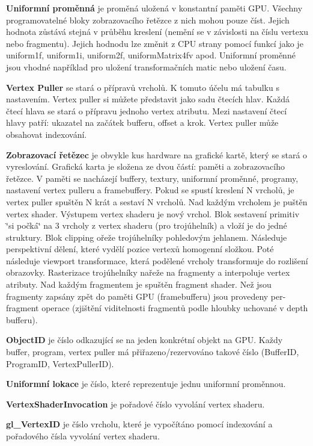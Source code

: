 {\bfseries Uniformní proměnná} je proměná uložená v konstantní paměti G\+PU. Všechny programovatelné bloky zobrazovacího řetězce z nich mohou pouze číst. Jejich hodnota zůstává stejná v průběhu kreslení (nemění se v závislosti na číslu vertexu nebo fragmentu). Jejich hodnodu lze změnit z C\+PU strany pomocí funkcí jako je uniform1f, uniform1i, uniform2f, uniform\+Matrix4fv apod. Uniformní proměnné jsou vhodné například pro uložení transformačních matic nebo uložení času.

{\bfseries Vertex Puller} se stará o přípravů vrcholů. K tomuto účelu má tabulku s nastavením. Vertex puller si můžete představit jako sadu čtecích hlav. Každá čtecí hlava se stará o přípravu jednoho vertex atributu. Mezi nastavení čtecí hlavy patří\+: ukazatel na začátek bufferu, offset a krok. Vertex puller může obsahovat indexování.

{\bfseries Zobrazovací řetězec} je obvykle kus hardware na grafické kartě, který se stará o vyreslování. Grafická karta je složena ze dvou částí\+: paměti a zobrazovacího řetězce. V paměti se nacházejí buffery, textury, uniformní proměnné, programy, nastavení vertex pulleru a framebuffery. Pokud se spustí kreslení N vrcholů, je vertex puller spuštěn N krát a sestaví N vrcholů. Nad každým vrcholem je puštěn vertex shader. Výstupem vertex shaderu je nový vrchol. Blok sestavení primitiv \char`\"{}si počká\char`\"{} na 3 vrcholy z vertex shaderu (pro trojúhelník) a vloží je do jedné struktury. Blok clipping ořeže trojúhelníky pohledovým jehlanem. Následuje perspektivní dělení, které vydělí pozice vertexů homogenní složkou. Poté následuje viewport transformace, která podělené vrcholy transformuje do rozlišení obrazovky. Rasterizace trojúhelníky nařeže na fragmenty a interpoluje vertex atributy. Nad každým fragmentem je spuštěn fragment shader. Než jsou fragmenty zapsány zpět do paměti G\+PU (framebufferu) jsou provedeny per-\/fragment operace (zjištění viditelnosti fragmentů podle hloubky uchované v depth bufferu). 

{\bfseries Object\+ID} je číslo odkazující se na jeden konkrétní objekt na G\+PU. Každy buffer, program, vertex puller má přiřazeno/rezervováno takové číslo (Buffer\+ID, Program\+ID, Vertex\+Puller\+ID).

{\bfseries Uniformní lokace} je číslo, které reprezentuje jednu uniformní proměnnou.

{\bfseries Vertex\+Shader\+Invocation} je pořadové číslo vyvolání vertex shaderu.

{\bfseries gl\+\_\+\+Vertex\+ID} je číslo vrcholu, které je vypočítáno pomocí indexování a pořadového čísla vyvolání vertex shaderu.

